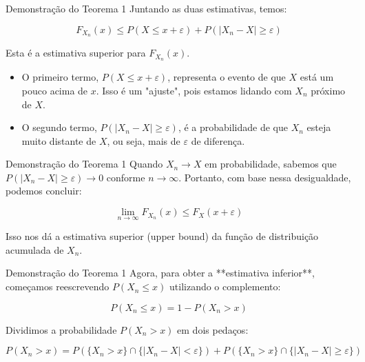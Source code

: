 \documentclass[12pt]{beamer}
\begin{document}
\begin{frame}{}
	\begin{block}{Demonstração do Teorema 1}
	Juntando as duas estimativas, temos:
	
	\[
	F_{X_n}(x) \leq P(X \leq x + \varepsilon) + P(|X_n - X| \geq \varepsilon)
	\]
	
	Esta é a estimativa superior para \( F_{X_n}(x) \).
	
	
	\begin{itemize}
		\item O primeiro termo, \( P(X \leq x + \varepsilon) \), representa o evento de que \( X \) está um pouco acima de \( x \). Isso é um "ajuste", pois estamos lidando com \( X_n \) próximo de \( X \).\pause
		\item O segundo termo, \( P(|X_n - X| \geq \varepsilon) \), é a probabilidade de que \( X_n \) esteja muito distante de \( X \), ou seja, mais de \( \varepsilon \) de diferença.	
	\end{itemize}
	\end{block}
\end{frame}

\begin{frame}{}
	\begin{block}{Demonstração do Teorema 1}
		Quando \( X_n \to X \) em probabilidade, sabemos que \( P(|X_n - X| \geq \varepsilon) \to 0 \) conforme \( n \to \infty \). Portanto, com base nessa desigualdade, podemos concluir:
		
		\[
		\lim_{n \to \infty} F_{X_n}(x) \leq F_X(x + \varepsilon)
		\]
		
		Isso nos dá a estimativa superior (upper bound) da função de distribuição acumulada de \( X_n \).
	\end{block}
\end{frame}


\begin{frame}{}
	\begin{block}{Demonstração do Teorema 1}
	Agora, para obter a **estimativa inferior**, começamos reescrevendo \( P(X_n \leq x) \) utilizando o complemento:
	
	\[
	P(X_n \leq x) = 1 - P(X_n > x)
	\]
	
	Dividimos a probabilidade \( P(X_n > x) \) em dois pedaços:
	
	\[
	P(X_n > x) = P(\{X_n > x\} \cap \{|X_n - X| < \varepsilon\}) + P(\{X_n > x\} \cap \{|X_n - X| \geq \varepsilon\})
	\]	
	\end{block}
\end{frame}
\end{document}
